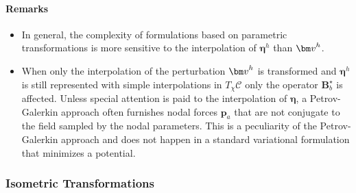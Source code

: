 \hypertarget{remarks04}{%
\paragraph{Remarks}\label{remarks04}}

\begin{itemize}
\item
  In general, the complexity of formulations based on parametric transformations %
  is more sensitive to the interpolation of \(\bm{\eta}^h\) than \(\VarConfig^h\).
\item
  When only the interpolation of the perturbation \(\VarConfig^h\) is
  transformed and \(\bm{\eta}^h\) is still represented
  with simple  interpolations in \(T_\chi\mathscr{C}\) only the operator
  \(\bm{B}^{\star}_b\) is affected. 
  Unless special attention is paid to the interpolation of $\bm{\eta}$,
  a Petrov-Galerkin approach often furnishes nodal forces $\bm{p}_a$ that
  are not conjugate to the field sampled by the nodal parameters.
  This is a peculiarity of the Petrov-Galerkin approach and does not happen 
  in a standard variational formulation that minimizes a potential.
\end{itemize}

\hypertarget{sec:isometric}{%
\subsubsection{Isometric Transformations}\label{sec:isometric}}

